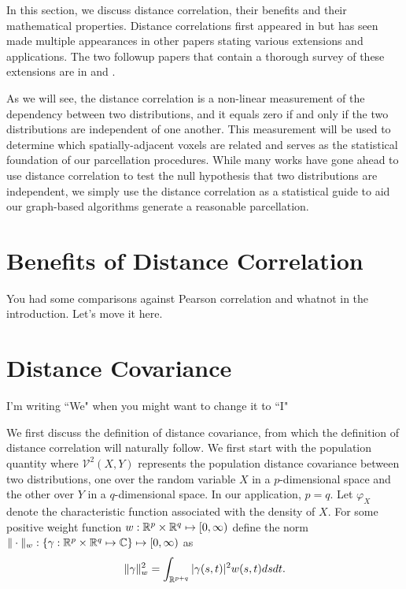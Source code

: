 
In this section, we discuss distance correlation, their benefits
and their mathematical
properties. Distance correlations first appeared in 
\cite{szekely2007measuring} but has seen made multiple appearances in other
papers stating
various extensions and applications. The two followup papers that
contain a thorough survey of these extensions are in \cite{szekely2013energy} and
\cite{sejdinovic2013equivalence}.

As we will see, the distance correlation is a non-linear
measurement of the dependency between two distributions, and it equals
zero if and only if the two distributions are independent of one another.
This measurement will be used to determine which spatially-adjacent voxels
are related and serves as the statistical foundation of our parcellation
procedures. While many works have gone ahead to use distance correlation to
test the null hypothesis that two distributions are independent, we simply
use the distance correlation as a statistical guide to aid our graph-based
algorithms generate a reasonable parcellation.


\section{Benefits of Distance Correlation}

{\color{red}You had some comparisons against Pearson correlation and whatnot
in the introduction. Let's move it here.}


\section{Distance Covariance}

{\color{red}I'm writing ``We" when you might want to change it to ``I"}

We first discuss the definition of distance covariance, from which the definition
of distance correlation will naturally follow. We first start with the
population quantity where $\mathcal{V}^2(X,Y)$ represents the population 
distance covariance between two distributions, one over the random variable
$X$ in a $p$-dimensional space and the other over $Y$ in a $q$-dimensional
space. In our application, $p=q$. Let $\varphi_X$ denote the characteristic
function associated with the density of $X$.
For some positive weight function
$w : \mathbb{R}^p \times \mathbb{R}^q \mapsto [0, \infty)$ define the norm
$\|\cdot\|_w : \{\gamma : \mathbb{R}^p \times \mathbb{R}^q \mapsto \mathbb{C}\}
               \mapsto [0, \infty)$ as
$$ \| \gamma \|_w^2 = \int_{\mathbb{R}^{p+q}} | \gamma(s,t) |^2 w(s,t) ds dt. $$


